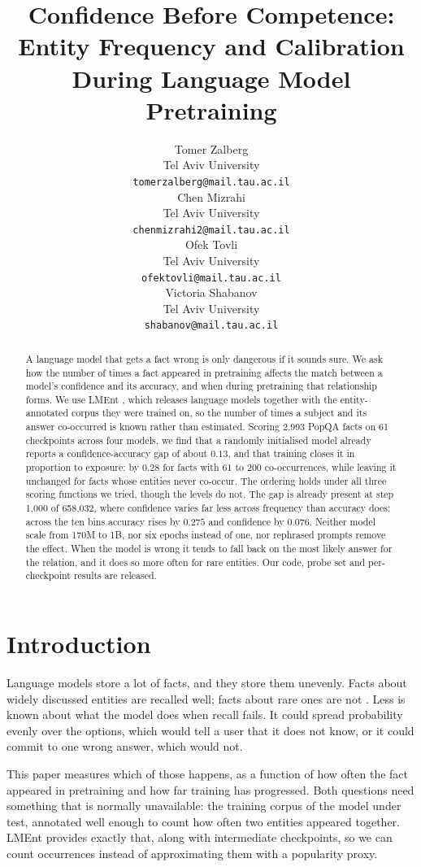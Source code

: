 \documentclass[11pt]{article}
\title{Confidence Before Competence: Entity Frequency and Calibration\\ During Language Model Pretraining}
\author{Tomer Zalberg \\ Tel Aviv University \\ \texttt{tomerzalberg@mail.tau.ac.il} \\\And
  Chen Mizrahi \\ Tel Aviv University \\ \texttt{chenmizrahi2@mail.tau.ac.il} \\\AND
  Ofek Tovli \\ Tel Aviv University \\ \texttt{ofektovli@mail.tau.ac.il} \\\And
  Victoria Shabanov \\ Tel Aviv University \\ \texttt{shabanov@mail.tau.ac.il} \\}
\begin{document}
\maketitle

\begin{abstract}
A language model that gets a fact wrong is only dangerous if it sounds sure. We ask how the
number of times a fact appeared in pretraining affects the match between a model's confidence
and its accuracy, and when during pretraining that relationship forms. We use LMEnt
\citep{gottesman-etal-2026-lment}, which releases language models together with the
entity-annotated corpus they were trained on, so the number of times a subject and its answer
co-occurred is known rather than estimated. Scoring 2{,}993 PopQA facts on 61 checkpoints across
four models, we find that a randomly initialised model already
reports a confidence-accuracy gap of about $0.13$, and that training closes it in proportion to
exposure: by $0.28$ for facts with 61 to 200 co-occurrences, while leaving it unchanged for
facts whose entities never co-occur. The ordering holds under all three scoring functions we tried, though
the levels do not. The gap is already present at step 1{,}000 of 658{,}032, where confidence
varies far less across frequency than accuracy does: across the ten bins accuracy rises by
$0.275$ and confidence by $0.076$. Neither model scale from 170M to 1B, nor six epochs instead of one, nor
rephrased prompts remove the effect. When the model is wrong it tends to fall back on the most
likely answer for the relation, and it does so more often for rare entities. Our code, probe set
and per-checkpoint results are released.
\end{abstract}

\section{Introduction}

Language models store a lot of facts, and they store them unevenly. Facts about widely discussed
entities are recalled well; facts about rare ones are not
\citep{mallen-etal-2023-trust, kandpal-etal-2023-large}. Less is known about what the model does
when recall fails. It could spread probability evenly over the options, which would tell a user
that it does not know, or it could commit to one wrong answer, which would not.

This paper measures which of those happens, as a function of how often the fact appeared in
pretraining and how far training has progressed. Both questions need something that
is normally unavailable: the training corpus of the model under test, annotated well enough to
count how often two entities appeared together. LMEnt \citep{gottesman-etal-2026-lment} provides
exactly that, along with intermediate checkpoints, so we can count occurrences instead of
approximating them with a popularity proxy.
\end{document}
